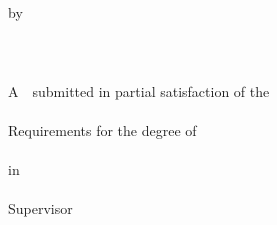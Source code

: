 {\begin{titlepage}
\begin{center}
  \qquad\\
  \qquad\\
  \begin{spacing}{2}
  \xiaosi
  by\\
  \@ename \\

  \qquad\\
  \@cbe\\
  A~\@cdegree~submitted in partial satisfaction of the\\

  \qquad\\
  Requirements for the degree of\\
  \@cclass\\

  \vspace{4\baselineskip}
  in\\
  \@ehnu\\
  Supervisor\\
  \@elevel~~ \@esupervisor\\
  \@edate
  \end{spacing}
\end{center}

\end{titlepage}



%

\clearpage{\thispagestyle{empty}\cleardoublepage}  %
\thispagestyle{empty} %

}
